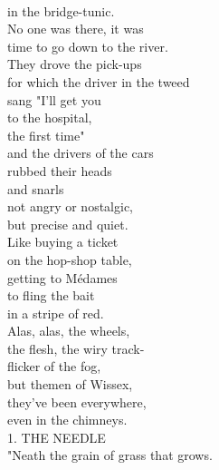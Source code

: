 \documentclass[smalldemyvopaper,11pt,twoside,onecolumn,openright,extrafontsizes]{memoir}
\begin{document}
\\in the bridge-tunic.
\\No one was there, it was
\\time to go down to the river.
\\They drove the pick-ups
\\for which the driver in the tweed
\\sang "I'll get you
\\to the hospital,
\\the first time"
\\and the drivers of the cars
\\rubbed their heads
\\and snarls
\\not angry or nostalgic,
\\but precise and quiet.
\\Like buying a ticket
\\on the hop-shop table,
\\getting to Médames
\\to fling the bait
\\in a stripe of red.
\\Alas, alas, the wheels,
\\the flesh, the wiry track-
\\flicker of the fog,
\\but themen of Wissex,
\\they've been everywhere,
\\even in the chimneys.
\\1. THE NEEDLE
\\"Neath the grain of grass that grows.
\end{document}
